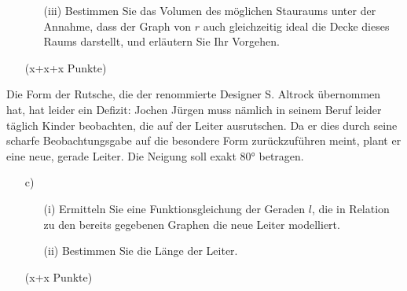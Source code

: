 \documentclass[ngerman, a4paper, 12pt]{article}
\begin{document}
\begin{enumerate}[resume]
    \item[]
        \begin{enumerate}[resume]
            \item[(iii)]
                Bestimmen Sie das Volumen des möglichen Stauraums unter der Annahme,
                dass der Graph von $r$ auch gleichzeitig ideal die Decke dieses Raums darstellt,
                und erläutern Sie Ihr Vorgehen.
        \end{enumerate}
        \begin{flushright}
            (x+x+x Punkte)
        \end{flushright}
\end{enumerate}

Die Form der Rutsche, die der renommierte Designer S. Altrock übernommen hat, hat leider ein Defizit:
Jochen Jürgen muss nämlich in seinem Beruf leider täglich Kinder beobachten, die auf der Leiter ausrutschen.
Da er dies durch seine scharfe Beobachtungsgabe auf die besondere Form zurückzuführen meint, plant er eine neue, gerade Leiter.
Die Neigung soll exakt 80° betragen.

\begin{enumerate}[resume]
    \item[c)]
        \begin{enumerate}
            \item[(i)]
                Ermitteln Sie eine Funktionsgleichung der Geraden $l$,
                die in Relation zu den bereits gegebenen Graphen die neue Leiter modelliert.
            \item[(ii)]
                Bestimmen Sie die Länge der Leiter.
        \end{enumerate}
        \begin{flushright}
            (x+x Punkte)
        \end{flushright}
\end{enumerate}
\end{document}
